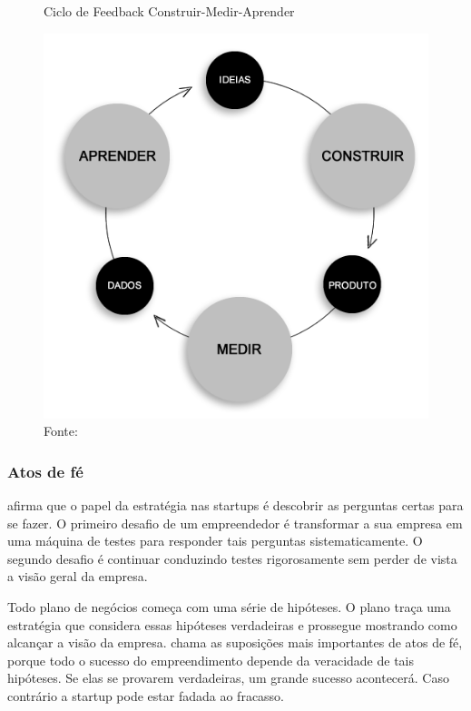 \begin{figure}[H]
\caption{Ciclo de Feedback Construir-Medir-Aprender}
\centerline{\includegraphics[scale=0.5]{img/ciclo_construir_medir_aprender}}
\label{fig:ciclo_construir_medir_aprender}
\caption* {Fonte: }
\end{figure}

\subsubsection{Atos de fé}
\label{cha:atos_de_fe}

 afirma que o papel da estratégia nas startups é descobrir as perguntas certas para se fazer. O primeiro desafio de um empreendedor é transformar a sua empresa em uma máquina de testes para responder tais perguntas sistematicamente. O segundo desafio é continuar conduzindo testes rigorosamente sem perder de vista a visão geral da empresa.

Todo plano de negócios começa com uma série de hipóteses. O plano traça uma estratégia que considera essas hipóteses verdadeiras e prossegue mostrando como alcançar a visão da empresa.  chama as suposições mais importantes de atos de fé, porque todo o sucesso do empreendimento depende da veracidade de tais hipóteses. Se elas se provarem verdadeiras, um grande sucesso acontecerá. Caso contrário a startup pode estar fadada ao fracasso.


